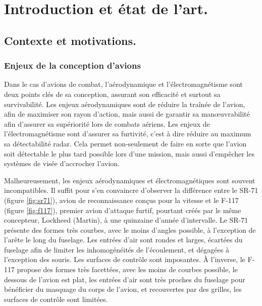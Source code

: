 \chapter{Introduction et état de l'art.}

\section{Contexte et motivations.}
\label{sec:intro}
\subsection{Enjeux de la conception d'avions}
\label{sec:enjeux}

Dans le cas d'avions de combat, l'aérodynamique et l'électromagnétisme sont deux points clés de sa conception, assurant son efficacité et surtout sa survivabilité. Les enjeux aérodynamiques sont de réduire la traînée de l'avion, afin de maximiser son rayon d'action, mais aussi de garantir sa man\oe uvrabilité afin d'assurer sa supériorité lors de combats aériens. Les enjeux de l'électromagnétisme sont d'assurer sa furtivité, c'est à dire réduire au maximum sa détectabilité radar. Cela permet non-seulement de faire en sorte que l'avion soit détectable le plus tard possible lors d'une mission, mais aussi d'empêcher les systèmes de visée d'accrocher l'avion.

Malheureusement, les enjeux aérodynamiques et électromagnétiques sont souvent incompatibles.  Il suffit pour s'en convaincre d'observer la différence  entre le SR-71 (figure \ref{fig:sr71}), avion de reconnaissance conçus pour la vitesse et le F-117 (figure \ref{fig:f117}), premier avion d'attaque furtif, pourtant créés par le même concepteur, Lockheed (Martin), à une quinzaine d'année d'intervalle. Le SR-71 présente des formes très courbes, avec le moins d'angles possible, à l'exception de l'arête le long du fuselage. Les entrées d'air sont rondes et larges, écartées du fuselage afin de limiter les inhomogénéités de l'écoulement, et dégagées à l'exception des souris. Les surfaces de contrôle sont imposantes. \`A l'inverse, le F-117 propose des formes très facettées, avec les moins de courbes possible, le dessous de l'avion est plat, les entrées d'air sont très proches du fuselage pour bénéficier du masquage du corps de l'avion, et recouvertes par des grilles, les surfaces de contrôle sont limitées.

